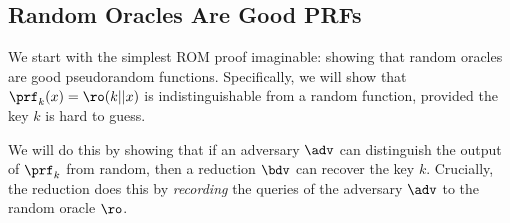 
  \iffalse
  \subsection{Random Oracles Are Good PRFs}
    We start with the simplest ROM proof imaginable: showing that random
      oracles are good pseudorandom functions. Specifically, we will show that
      $\prf_k(x) = \ro(k || x)$ is indistinguishable from a random function, provided the
      key $k$ is hard to guess.
      
    We will do this by showing that if an adversary $\adv$ can
      distinguish the output of $\prf_k$ from random, then a reduction $\bdv$
      can recover the key $k$. Crucially, the reduction does this by
      \emph{recording} the queries of the adversary $\adv$ to the random oracle
      $\ro$.


